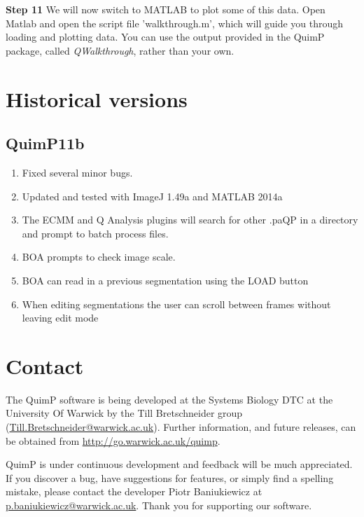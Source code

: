 \documentclass[a4paper,12pt]{article}
\begin{document}
\textbf{Step 11} We will now switch to MATLAB to plot some of this data.  Open Matlab
and open the script file 'walkthrough.m', which will guide you through loading and plotting data.
You can use the output provided in the QuimP package, called \textit{QWalkthrough}, rather than
your own.

\section {Historical versions}

\subsection{QuimP11b}

\begin{enumerate}
	\item Fixed several minor bugs.
	\item Updated and tested with ImageJ 1.49a and MATLAB 2014a
	\item The ECMM and Q Analysis plugins will search for other .paQP in a directory and prompt to batch process files.
	\item BOA prompts to check image scale.
	\item BOA can read in a previous segmentation using the LOAD button
	\item When editing segmentations the user can scroll between frames without leaving edit mode
\end{enumerate}

\section{Contact}

The QuimP software is being developed at the Systems Biology DTC at the University Of Warwick by the Till Bretschneider group (\href{mailto:till.bretschneider@warwick.ac.uk}{Till.Bretschneider@warwick.ac.uk}).
Further information, and future releases, can be obtained from \url{http://go.warwick.ac.uk/quimp}.

QuimP is under continuous development and feedback will be much appreciated.  If you discover a bug, have suggestions 
for features, or simply find a spelling mistake, please contact the developer Piotr Baniukiewicz at \href{mailto:p.baniukiewicz@warwick.ac.uk}{p.baniukiewicz@warwick.ac.uk}. Thank you for supporting our software. 

 
\end{document}
